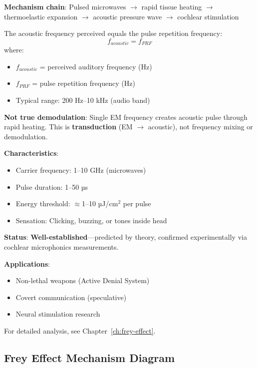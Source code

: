 \textbf{Mechanism chain}: Pulsed microwaves $\rightarrow$ rapid tissue heating $\rightarrow$ thermoelastic expansion $\rightarrow$ acoustic pressure wave $\rightarrow$ cochlear stimulation

The acoustic frequency perceived equals the pulse repetition frequency:
\begin{equation}
\label{eq:frey-frequency}
f_{acoustic} = f_{PRF}
\end{equation}
where:
\begin{itemize}
\item $f_{acoustic}$ = perceived auditory frequency (Hz)
\item $f_{PRF}$ = pulse repetition frequency (Hz)
\item Typical range: 200 Hz--10 kHz (audio band)
\end{itemize}

\begin{warningbox}
\textbf{Not true demodulation}: Single EM frequency creates acoustic pulse through rapid heating. This is \textbf{transduction} (EM $\rightarrow$ acoustic), not frequency mixing or demodulation.
\end{warningbox}

\textbf{Characteristics}:
\begin{itemize}
\item Carrier frequency: 1--10 GHz (microwaves)
\item Pulse duration: 1--50 µs
\item Energy threshold: $\approx$1--10 µJ/cm$^2$ per pulse
\item Sensation: Clicking, buzzing, or tones inside head
\end{itemize}

\textbf{Status}: \textbf{Well-established}---predicted by theory, confirmed experimentally via cochlear microphonics measurements.

\textbf{Applications}:
\begin{itemize}
\item Non-lethal weapons (Active Denial System)
\item Covert communication (speculative)
\item Neural stimulation research
\end{itemize}

For detailed analysis, see Chapter~\ref{ch:frey-effect}.

\subsection{Frey Effect Mechanism Diagram}


